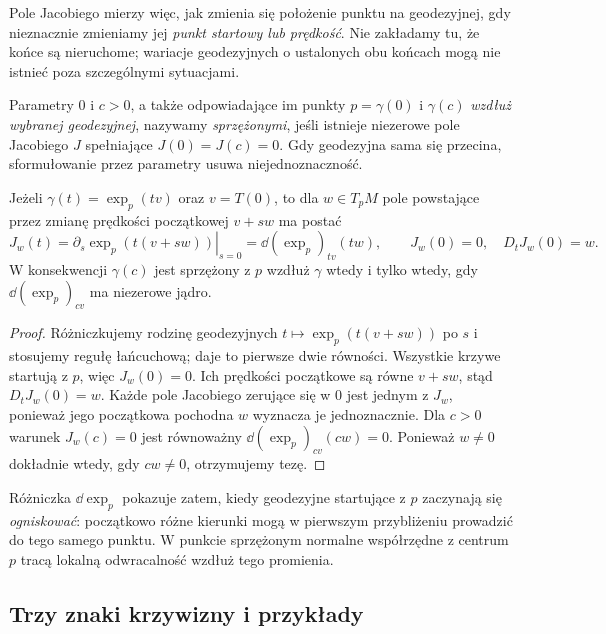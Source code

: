 Pole Jacobiego mierzy więc, jak zmienia się
położenie punktu na geodezyjnej, gdy nieznacznie
zmieniamy jej \emph{punkt startowy lub prędkość}.
Nie zakładamy tu, że końce są nieruchome;
wariacje geodezyjnych o ustalonych obu końcach
mogą nie istnieć poza szczególnymi sytuacjami.

\begin{definicja}
\label{def:punkty-sprzezone}
Parametry $0$ i $c>0$, a także odpowiadające
im punkty $p=\gamma(0)$ i $\gamma(c)$
\emph{wzdłuż wybranej geodezyjnej}, nazywamy
\emph{sprzężonymi}, jeśli istnieje niezerowe
pole Jacobiego $J$ spełniające
$J(0)=J(c)=0$. Gdy geodezyjna sama się
przecina, sformułowanie przez parametry
usuwa niejednoznaczność.
\end{definicja}

\begin{stwierdzenie}
\label{prop:jacobi-dexp}
Jeżeli $\gamma(t)=\exp_p(tv)$ oraz $v=T(0)$,
to dla $w\in T_pM$ pole powstające przez
zmianę prędkości początkowej $v+sw$ ma postać
\begin{equation}\label{eq:jacobi-dexp}
 J_w(t)=\left.\partial_s\exp_p(t(v+sw))\right|_{s=0}
       =\dd(\exp_p)_{tv}(tw),
 \qquad J_w(0)=0,\quad D_tJ_w(0)=w.
\end{equation}
W konsekwencji $\gamma(c)$ jest sprzężony z $p$
wzdłuż $\gamma$ wtedy i tylko wtedy, gdy
$\dd(\exp_p)_{cv}$ ma niezerowe jądro.
\end{stwierdzenie}
\begin{proof}
Różniczkujemy rodzinę geodezyjnych
$t\mapsto\exp_p(t(v+sw))$ po $s$ i stosujemy
regułę łańcuchową; daje to pierwsze dwie
równości. Wszystkie krzywe startują z $p$,
więc $J_w(0)=0$. Ich prędkości początkowe
są równe $v+sw$, stąd $D_tJ_w(0)=w$.
Każde pole Jacobiego zerujące się w $0$
jest jednym z $J_w$, ponieważ jego
początkowa pochodna $w$ wyznacza je jednoznacznie.
Dla $c>0$ warunek $J_w(c)=0$ jest równoważny
$\dd(\exp_p)_{cv}(cw)=0$. Ponieważ
$w\ne0$ dokładnie wtedy, gdy $cw\ne0$,
otrzymujemy tezę.
\end{proof}

Różniczka $\dd\exp_p$ pokazuje zatem,
kiedy geodezyjne startujące z $p$ zaczynają
się \emph{ogniskować}: początkowo różne kierunki
mogą w pierwszym przybliżeniu prowadzić
do tego samego punktu. W punkcie sprzężonym
normalne współrzędne z centrum $p$ tracą
lokalną odwracalność wzdłuż tego promienia.

\subsection*{Trzy znaki krzywizny i przykłady}

